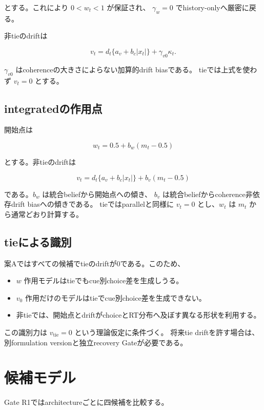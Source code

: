 \documentclass[11pt]{ltjsarticle}
\begin{document}
とする。これにより \(0<w_t<1\) が保証され、
\(\gamma_w=0\) でhistory-onlyへ厳密に戻る。

非tieのdriftは

\[
v_t=d_t\{a_v+b_c|x_t|\}+\gamma_{v0}\kappa_t .
\]

\(\gamma_{v0}\) はcoherenceの大きさによらない加算的drift biasである。
tieでは上式を使わず \(v_t=0\) とする。

\subsection{integratedの作用点}

開始点は

\[
w_t=0.5+b_w(m_t-0.5)
\]

とする。非tieのdriftは

\[
v_t=d_t\{a_v+b_c|x_t|\}+b_v(m_t-0.5)
\]

である。\(b_w\) は統合beliefから開始点への傾き、
\(b_v\) は統合beliefからcoherence非依存drift biasへの傾きである。
tieではparallelと同様に \(v_t=0\) とし、\(w_t\) は \(m_t\) から通常どおり計算する。

\subsection{tieによる識別}

案Aではすべての候補でtieのdriftが0である。このため、

\begin{itemize}
  \item \(w\) 作用モデルはtieでもcue別choice差を生成しうる。
  \item \(v_0\) 作用だけのモデルはtieでcue別choice差を生成できない。
  \item 非tieでは、開始点とdriftがchoiceとRT分布へ及ぼす異なる形状を利用する。
\end{itemize}

この識別力は \(v_{\mathrm{tie}}=0\) という理論仮定に条件づく。
将来tie driftを許す場合は、別formulation versionと独立recovery Gateが必要である。

\section{候補モデル}

Gate R1ではarchitectureごとに四候補を比較する。
\end{document}
